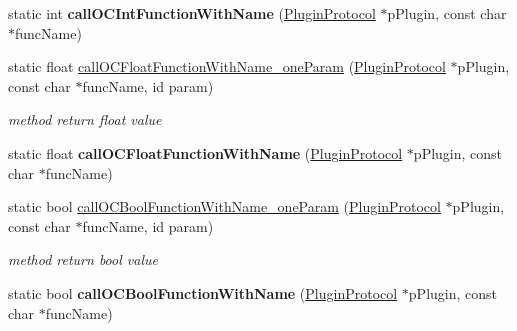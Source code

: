 \begin{DoxyCompactItemize}
\mbox{\label{classcocos2d_1_1plugin_1_1PluginUtilsIOS_a53a9d501dc70362e1247ef28059357d4}} 
static int {\bfseries call\+O\+C\+Int\+Function\+With\+Name} (\hyperlink{classcocos2d_1_1plugin_1_1PluginProtocol}{Plugin\+Protocol} $\ast$p\+Plugin, const char $\ast$func\+Name)
\item 
\mbox{\label{classcocos2d_1_1plugin_1_1PluginUtilsIOS_a89c7498900cbde9b25dceffd6662db78}} 
static float \hyperlink{classcocos2d_1_1plugin_1_1PluginUtilsIOS_a89c7498900cbde9b25dceffd6662db78}{call\+O\+C\+Float\+Function\+With\+Name\+\_\+one\+Param} (\hyperlink{classcocos2d_1_1plugin_1_1PluginProtocol}{Plugin\+Protocol} $\ast$p\+Plugin, const char $\ast$func\+Name, id param)
\begin{DoxyCompactList}\small\item\em method return float value \end{DoxyCompactList}\item 
\mbox{\label{classcocos2d_1_1plugin_1_1PluginUtilsIOS_a637220e47ba3b83e5c56a868b4a631f7}} 
static float {\bfseries call\+O\+C\+Float\+Function\+With\+Name} (\hyperlink{classcocos2d_1_1plugin_1_1PluginProtocol}{Plugin\+Protocol} $\ast$p\+Plugin, const char $\ast$func\+Name)
\item 
\mbox{\label{classcocos2d_1_1plugin_1_1PluginUtilsIOS_af9a378b5eae7a89cb41634ae029eb50f}} 
static bool \hyperlink{classcocos2d_1_1plugin_1_1PluginUtilsIOS_af9a378b5eae7a89cb41634ae029eb50f}{call\+O\+C\+Bool\+Function\+With\+Name\+\_\+one\+Param} (\hyperlink{classcocos2d_1_1plugin_1_1PluginProtocol}{Plugin\+Protocol} $\ast$p\+Plugin, const char $\ast$func\+Name, id param)
\begin{DoxyCompactList}\small\item\em method return bool value \end{DoxyCompactList}\item 
\mbox{\label{classcocos2d_1_1plugin_1_1PluginUtilsIOS_ad3fef36f15b6a43bcb1bdd973dfedf03}} 
static bool {\bfseries call\+O\+C\+Bool\+Function\+With\+Name} (\hyperlink{classcocos2d_1_1plugin_1_1PluginProtocol}{Plugin\+Protocol} $\ast$p\+Plugin, const char $\ast$func\+Name)

\end{DoxyCompactItemize}
